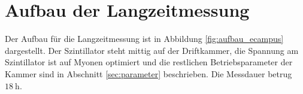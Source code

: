 \section{Aufbau der Langzeitmessung}

Der Aufbau für die Langzeitmessung ist in Abbildung \ref{fig:aufbau_ecampus} dargestellt. Der Szintillator steht mittig auf der Driftkammer, die Spannung am Szintillator ist auf Myonen optimiert und die restlichen Betriebsparameter der Kammer sind in Abschnitt \ref{sec:parameter} beschrieben. Die Messdauer betrug $\SI{18}{\hour}$.
